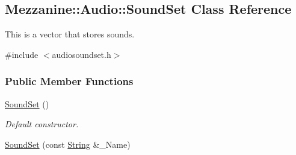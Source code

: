 \hypertarget{classMezzanine_1_1Audio_1_1SoundSet}{
\subsection{Mezzanine::Audio::SoundSet Class Reference}
\label{classMezzanine_1_1Audio_1_1SoundSet}
}


This is a vector that stores sounds.  




{\ttfamily \#include $<$audiosoundset.h$>$}

\subsubsection*{Public Member Functions}
\begin{DoxyCompactItemize}
\item 
\hypertarget{classMezzanine_1_1Audio_1_1SoundSet_aa0a7e1e9f16d3bd264737b02b2e489cf}{
\hyperlink{classMezzanine_1_1Audio_1_1SoundSet_aa0a7e1e9f16d3bd264737b02b2e489cf}{SoundSet} ()}
\label{classMezzanine_1_1Audio_1_1SoundSet_aa0a7e1e9f16d3bd264737b02b2e489cf}

\begin{DoxyCompactList}\small\item\em Default constructor. \item\end{DoxyCompactList}\item 
\hypertarget{classMezzanine_1_1Audio_1_1SoundSet_a3a93d5bc85dd3f3883d9dc9f56353e0f}{
\hyperlink{classMezzanine_1_1Audio_1_1SoundSet_a3a93d5bc85dd3f3883d9dc9f56353e0f}{SoundSet} (const \hyperlink{namespaceMezzanine_acf9fcc130e6ebf08e3d8491aebcf1c86}{String} \&\_\-Name)}
\label{classMezzanine_1_1Audio_1_1SoundSet_a3a93d5bc85dd3f3883d9dc9f56353e0f}


\end{DoxyCompactItemize}
